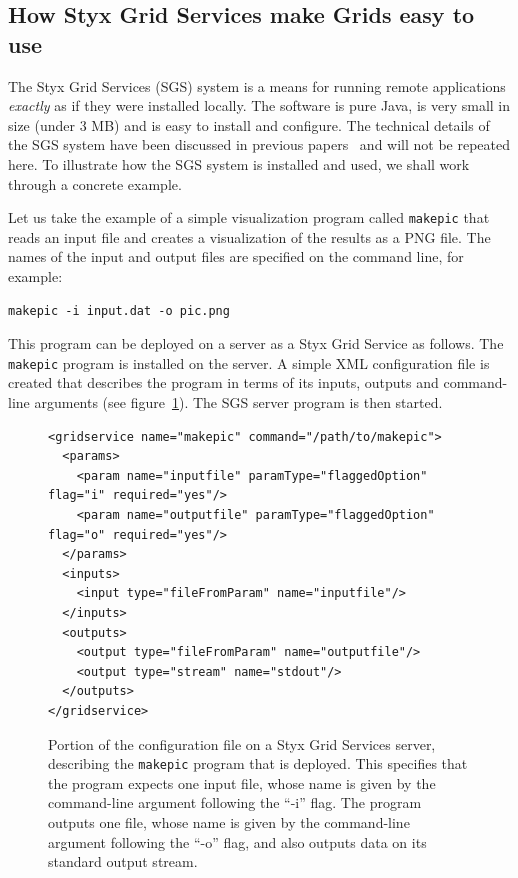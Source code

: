 \documentclass[a4paper]{article}
\begin{document}
\begin{multicols}{2}
\section{How Styx Grid Services make Grids easy to use}
The Styx Grid Services (SGS) system is a means for running remote applications {\em exactly\/} as if they were installed locally.  The software is pure Java, is very small in size (under 3 MB) and is easy to install and configure.  The technical details of the SGS system have been discussed in previous papers~\cite{blower:2005,blower:2006} and will not be repeated here.  To illustrate how the SGS system is installed and used, we shall work through a concrete example.

Let us take the example of a simple visualization program called {\tt makepic} that reads an input file and creates a visualization of the results as a PNG file.  The names of the input and output files are specified on the command line, for example:

\begin{verbatim}
makepic -i input.dat -o pic.png
\end{verbatim}

This program can be deployed on a server as a Styx Grid Service as follows.  The {\tt makepic} program is installed on the server.  A simple XML configuration file is created that describes the program in terms of its inputs, outputs and command-line arguments (see figure~\ref{fig:makepicconfig}).  The SGS server program is then started.

\begin{figure}
\centering
\begin{verbatim}
<gridservice name="makepic" command="/path/to/makepic">
  <params>
    <param name="inputfile" paramType="flaggedOption" flag="i" required="yes"/>
    <param name="outputfile" paramType="flaggedOption" flag="o" required="yes"/>
  </params>
  <inputs>
    <input type="fileFromParam" name="inputfile"/>
  </inputs>
  <outputs>
    <output type="fileFromParam" name="outputfile"/>
    <output type="stream" name="stdout"/>
  </outputs>
</gridservice>
\end{verbatim}
\caption{Portion of the configuration file on a Styx Grid Services server, describing the {\tt makepic} program that is deployed.  This specifies that the program expects one input file, whose name is given by the command-line argument following the ``-i'' flag.  The program outputs one file, whose name is given by the command-line argument following the ``-o'' flag, and also outputs data on its standard output stream.}
\label{fig:makepicconfig}
\end{figure}


\end{multicols}
\end{document}
